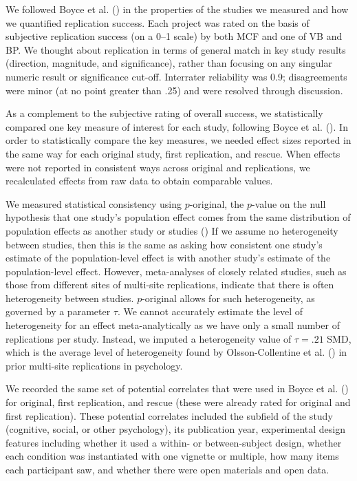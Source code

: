 \documentclass[
  english,
  a4paper,
]{article}
\begin{document}
We followed Boyce et al. () in the properties of the studies we measured and how we quantified replication success.
Each project was rated on the basis of subjective replication success (on a 0--1 scale) by both MCF and one of VB and BP.
We thought about replication in terms of general match in key study results (direction, magnitude, and significance), rather than focusing on any singular numeric result or significance cut-off.
Interrater reliability was 0.9; disagreements were minor (at no point greater than .25) and were resolved through discussion.

As a complement to the subjective rating of overall success, we statistically compared one key measure of interest for each study, following Boyce et al. ().
In order to statistically compare the key measures, we needed effect sizes reported in the same way for each original study, first replication, and rescue.
When effects were not reported in consistent ways across original and replications, we recalculated effects from raw data to obtain comparable values.

We measured statistical consistency using \(p\)-original, the \(p\)-value on the null hypothesis that one study's population effect comes from the same distribution of population effects as another study or studies () If we assume no heterogeneity between studies, then this is the same as asking how consistent one study's estimate of the population-level effect is with another study's estimate of the population-level effect.
However, meta-analyses of closely related studies, such as those from different sites of multi-site replications, indicate that there is often heterogeneity between studies.
\(p\)-original allows for such heterogeneity, as governed by a parameter \(\tau\).
We cannot accurately estimate the level of heterogeneity for an effect meta-analytically as we have only a small number of replications per study.
Instead, we imputed a heterogeneity value of \(\tau=.21\) SMD, which is the average level of heterogeneity found by Olsson-Collentine et al. () in prior multi-site replications in psychology.

We recorded the same set of potential correlates that were used in Boyce et al. () for original, first replication, and rescue (these were already rated for original and first replication).
These potential correlates included the subfield of the study (cognitive, social, or other psychology), its publication year, experimental design features including whether it used a within- or between-subject design, whether each condition was instantiated with one vignette or multiple, how many items each participant saw, and whether there were open materials and open data.
\end{document}
